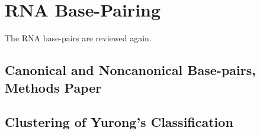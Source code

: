 \chapter{RNA Base-Pairing}
\label{basepairs} 

The RNA base-pairs are reviewed again.
\section{Canonical and Noncanonical Base-pairs, Methods Paper}
\section{Clustering of Yurong's Classification}



